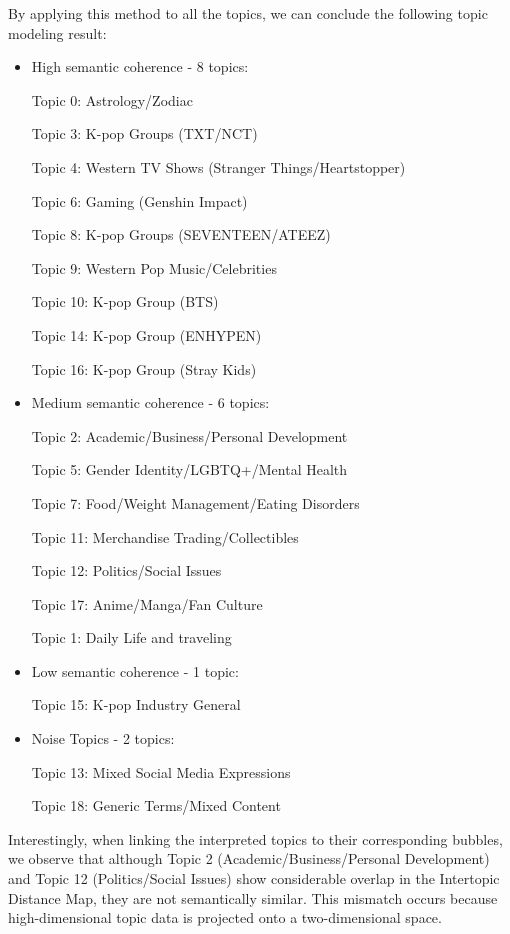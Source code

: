 \documentclass[12pt]{article}
\numberwithin{figure}{section}  %
\begin{document}
	By applying this method to all the topics, we can conclude the following
	topic modeling result:
	\begin{itemize}
	\item High semantic coherence - 8 topics:
	
		Topic 0: Astrology/Zodiac
		
		Topic 3: K-pop Groups (TXT/NCT)
		
		Topic 4: Western TV Shows (Stranger Things/Heartstopper)
		
		Topic 6: Gaming (Genshin Impact)
		
		Topic 8: K-pop Groups (SEVENTEEN/ATEEZ)
		
		Topic 9: Western Pop Music/Celebrities
		
		Topic 10: K-pop Group (BTS)
		
		Topic 14: K-pop Group (ENHYPEN)
		
		Topic 16: K-pop Group (Stray Kids)
	\item 	Medium semantic coherence - 6 topics:
	
		Topic 2: Academic/Business/Personal Development
		
		Topic 5: Gender Identity/LGBTQ+/Mental Health
		
		Topic 7: Food/Weight Management/Eating Disorders
		
		Topic 11: Merchandise Trading/Collectibles
		
		Topic 12: Politics/Social Issues
		
		Topic 17: Anime/Manga/Fan Culture
		
		Topic 1: Daily Life and traveling
	\item 	Low semantic coherence - 1 topic:
	
		Topic 15: K-pop Industry General
	\item Noise Topics - 2 topics:
	
		Topic 13: Mixed Social Media Expressions
		
		Topic 18: Generic Terms/Mixed Content
	\end{itemize}
	
	Interestingly, when linking the interpreted topics to their corresponding
	bubbles, we observe that although Topic 2 (Academic/Business/Personal
	Development) and Topic 12 (Politics/Social Issues) show considerable overlap
	in the Intertopic Distance Map, they are not semantically similar. This
	mismatch occurs because high-dimensional topic data is projected onto a
	two-dimensional space.
	
\end{document}

